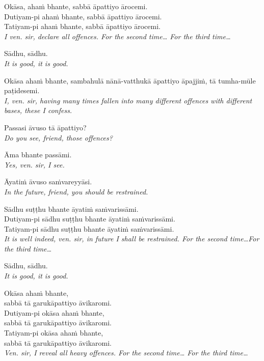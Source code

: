 \hangindent=25pt%
\parbox{22pt}{} Okāsa, ahaṁ bhante, sabbā āpattiyo ārocemi.\\
Dutiyam-pi ahaṁ bhante, sabbā āpattiyo ārocemi.\\
Tatiyam-pi ahaṁ bhante, sabbā āpattiyo ārocemi.\\
\emph{I ven. sir, declare all offences. For the second time… For the third time…}

\hangindent=25pt%
\parbox{22pt}{} Sādhu, sādhu.\\ \emph{It is good, it is good.}

\hangindent=25pt%
\parbox{22pt}{} Okāsa ahaṁ bhante, sambahulā nānā-vatthukā āpattiyo āpajjiṁ, tā tumha-mūle paṭidesemi.\\ \emph{I, ven. sir, having many times fallen into many different offences with different bases, these I confess.}

\hangindent=25pt%
\parbox{22pt}{} Passasi āvuso tā āpattiyo?\\ \emph{Do you see, friend, those offences?}

\hangindent=25pt%
\parbox{22pt}{} Āma bhante passāmi.\\ \emph{Yes, ven. sir, I see.}

\hangindent=25pt%
\parbox{22pt}{} Āyatiṁ āvuso saṁvareyyāsi.\\ \emph{In the future, friend, you should be restrained.}

\hangindent=25pt%
\parbox{22pt}{} Sādhu suṭṭhu bhante āyatiṁ saṁvarissāmi.\\
Dutiyam-pi sādhu suṭṭhu bhante āyatiṁ saṁvarissāmi.\\
Tatiyam-pi sādhu suṭṭhu bhante āyatiṁ saṁvarissāmi.\\
\emph{It is well indeed, ven. sir, in future I shall be restrained. For the second time…For the third time…}

\hangindent=25pt%
\parbox{22pt}{} Sādhu, sādhu.\\ \emph{It is good, it is good.}

\hangindent=25pt%
\parbox{22pt}{} Okāsa ahaṁ bhante,\\
sabbā tā garukāpattiyo āvikaromi.\\
Dutiyam-pi okāsa ahaṁ bhante,\\
sabbā tā garukāpattiyo āvikaromi.\\
Tatiyam-pi okāsa ahaṁ bhante,\\
sabbā tā garukāpattiyo āvikaromi.\\
\emph{Ven. sir, I reveal all heavy offences. For the second time… For the third time…}

